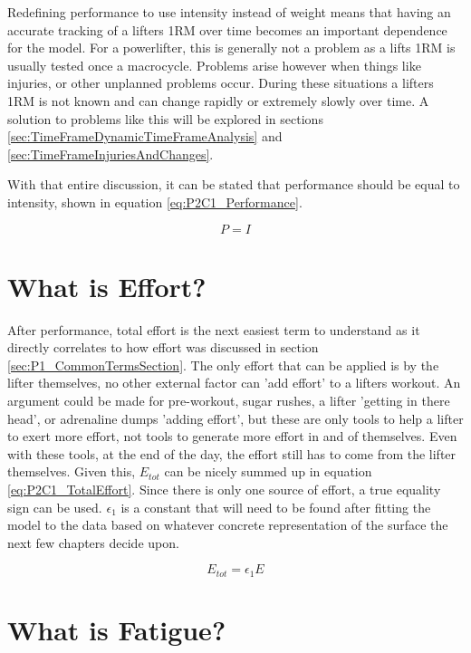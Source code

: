 Redefining performance to use intensity instead of weight means that having an accurate tracking of a lifters 1RM over time becomes an important dependence for the model. For a powerlifter, this is generally not a problem as a lifts 1RM is usually tested once a macrocycle. Problems arise however when things like injuries, or other unplanned problems occur. During these situations a lifters 1RM is not known and can change rapidly or extremely slowly over time. A solution to problems like this will be explored in sections \ref{sec:TimeFrameDynamicTimeFrameAnalysis} and \ref{sec:TimeFrameInjuriesAndChanges}.

With that entire discussion, it can be stated that performance should be equal to intensity, shown in equation \ref{eq:P2C1_Performance}.

\begin{equation}
	\label{eq:P2C1_Performance}
	P=I
\end{equation}

\section{What is Effort?}
\label{sec:P2C1_WhatIsEffort}

After performance, total effort is the next easiest term to understand as it directly correlates to how effort was discussed in section \ref{sec:P1_CommonTermsSection}. The only effort that can be applied is by the lifter themselves, no other external factor can 'add effort' to a lifters workout. An argument could be made for pre-workout, sugar rushes, a lifter 'getting in there head', or adrenaline dumps 'adding effort', but these are only tools to help a lifter to exert more effort, not tools to generate more effort in and of themselves. Even with these tools, at the end of the day, the effort still has to come from the lifter themselves. Given this, $E_{tot}$ can be nicely summed up in equation \ref{eq:P2C1_TotalEffort}. Since there is only one source of effort, a true equality sign can be used. $\epsilon_1$ is a constant that will need to be found after fitting the model to the data based on whatever concrete representation of the surface the next few chapters decide upon.

\begin{equation}
	\label{eq:P2C1_TotalEffort}
	E_{tot}=\epsilon_1 E
\end{equation}


\section{What is Fatigue?}
\label{sec:P2C1_WhatIsFatigue}

